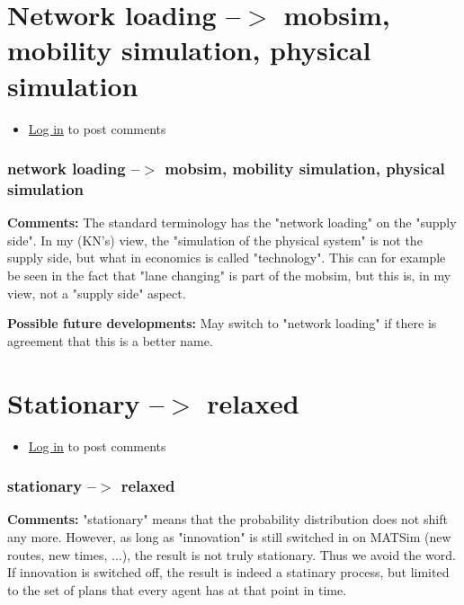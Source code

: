 \documentclass[a4paper,11pt]{report}
\begin{document}
\vfill\eject
\section{Network loading --$>$ mobsim, mobility simulation, physical simulation}
\begin{itemize}
	\item \href{http://www.matsim.org/user/login?destination=comment/reply/543%23comment-form}{Log in} to post comments
\end{itemize}

\subsubsection{network loading --$>$ mobsim, mobility simulation, physical simulation}

\textbf{Comments:} The standard terminology has the "network   loading" on the "supply  side". In my (KN's) view, the  "simulation of  the physical system" is  not the supply side, but what  in economics is  called "technology". This  can for example be  seen in the fact that  "lane changing" is part of the  mobsim, but this  is, in my view, not a  "supply side" aspect.

\textbf{Possible future developments:} May switch to "network loading" if there is agreement that this is a better name.

\vfill\eject
\section{Stationary --$>$ relaxed}
\begin{itemize}
	\item \href{http://www.matsim.org/user/login?destination=comment/reply/542%23comment-form}{Log in} to post comments
\end{itemize}

\subsubsection{stationary --$>$ relaxed}

\textbf{Comments:} "stationary" means that the probability   distribution does not shift any  more. However, as long as  "innovation"  is still switched in on MATSim  (new routes, new times,  ...), the  result is not truly stationary. Thus  we avoid the  word. If innovation  is switched off, the result is indeed a   statinary process, but limited  to the set of plans that every agent has   at that point in time.
\end{document}

